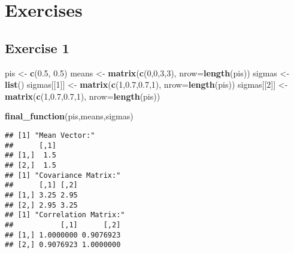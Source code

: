 \documentclass[]{article}
\newenvironment{Shaded}{\begin{snugshade}}{\end{snugshade}}
\newcommand{\DataTypeTok}[1]{\textcolor[rgb]{0.13,0.29,0.53}{#1}}
\newcommand{\DecValTok}[1]{\textcolor[rgb]{0.00,0.00,0.81}{#1}}
\newcommand{\FloatTok}[1]{\textcolor[rgb]{0.00,0.00,0.81}{#1}}
\newcommand{\KeywordTok}[1]{\textcolor[rgb]{0.13,0.29,0.53}{\textbf{#1}}}
\newcommand{\NormalTok}[1]{#1}
\newcommand{\StringTok}[1]{\textcolor[rgb]{0.31,0.60,0.02}{#1}}
\begin{document}
\newpage

\hypertarget{exercises}{%
\section{Exercises}\label{exercises}}

\hypertarget{exercise-1}{%
\subsection{Exercise 1}\label{exercise-1}}

\begin{Shaded}
\begin{Highlighting}[]
\NormalTok{pis <-}\StringTok{ }\KeywordTok{c}\NormalTok{(}\FloatTok{0.5}\NormalTok{, }\FloatTok{0.5}\NormalTok{)}
\NormalTok{means <-}\StringTok{ }\KeywordTok{matrix}\NormalTok{(}\KeywordTok{c}\NormalTok{(}\DecValTok{0}\NormalTok{,}\DecValTok{0}\NormalTok{,}\DecValTok{3}\NormalTok{,}\DecValTok{3}\NormalTok{), }\DataTypeTok{nrow=}\KeywordTok{length}\NormalTok{(pis))}
\NormalTok{sigmas <-}\StringTok{ }\KeywordTok{list}\NormalTok{()}
\NormalTok{sigmas[[}\DecValTok{1}\NormalTok{]] <-}\StringTok{ }\KeywordTok{matrix}\NormalTok{(}\KeywordTok{c}\NormalTok{(}\DecValTok{1}\NormalTok{,}\FloatTok{0.7}\NormalTok{,}\FloatTok{0.7}\NormalTok{,}\DecValTok{1}\NormalTok{), }\DataTypeTok{nrow=}\KeywordTok{length}\NormalTok{(pis))}
\NormalTok{sigmas[[}\DecValTok{2}\NormalTok{]] <-}\StringTok{ }\KeywordTok{matrix}\NormalTok{(}\KeywordTok{c}\NormalTok{(}\DecValTok{1}\NormalTok{,}\FloatTok{0.7}\NormalTok{,}\FloatTok{0.7}\NormalTok{,}\DecValTok{1}\NormalTok{), }\DataTypeTok{nrow=}\KeywordTok{length}\NormalTok{(pis))}
\end{Highlighting}
\end{Shaded}

\begin{Shaded}
\begin{Highlighting}[]
\KeywordTok{final_function}\NormalTok{(pis,means,sigmas)}
\end{Highlighting}
\end{Shaded}

\begin{verbatim}
## [1] "Mean Vector:"
##      [,1]
## [1,]  1.5
## [2,]  1.5
## [1] "Covariance Matrix:"
##      [,1] [,2]
## [1,] 3.25 2.95
## [2,] 2.95 3.25
## [1] "Correlation Matrix:"
##           [,1]      [,2]
## [1,] 1.0000000 0.9076923
## [2,] 0.9076923 1.0000000
\end{verbatim}
\end{document}
